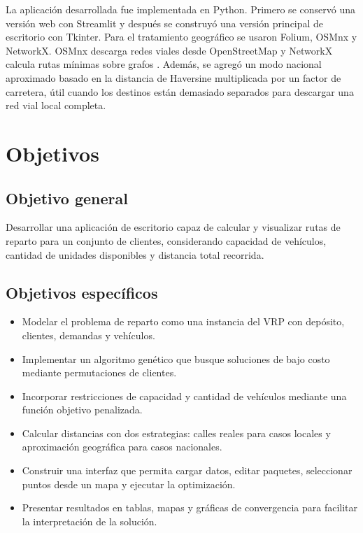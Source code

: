 \documentclass[runningheads]{llncs}
\begin{document}
La aplicación desarrollada fue implementada en Python. Primero se conservó una versión web con Streamlit y después se construyó una versión principal de escritorio con Tkinter. Para el tratamiento geográfico se usaron Folium, OSMnx y NetworkX. OSMnx descarga redes viales desde OpenStreetMap \cite{openstreetmap2017,boeing2017osmnx} y NetworkX calcula rutas mínimas sobre grafos \cite{networkx2008}. Además, se agregó un modo nacional aproximado basado en la distancia de Haversine multiplicada por un factor de carretera, útil cuando los destinos están demasiado separados para descargar una red vial local completa.

\section{Objetivos}

\subsection{Objetivo general}

Desarrollar una aplicación de escritorio capaz de calcular y visualizar rutas de reparto para un conjunto de clientes, considerando capacidad de vehículos, cantidad de unidades disponibles y distancia total recorrida.

\subsection{Objetivos específicos}

\begin{itemize}
    \item Modelar el problema de reparto como una instancia del VRP con depósito, clientes, demandas y vehículos.
    \item Implementar un algoritmo genético que busque soluciones de bajo costo mediante permutaciones de clientes.
    \item Incorporar restricciones de capacidad y cantidad de vehículos mediante una función objetivo penalizada.
    \item Calcular distancias con dos estrategias: calles reales para casos locales y aproximación geográfica para casos nacionales.
    \item Construir una interfaz que permita cargar datos, editar paquetes, seleccionar puntos desde un mapa y ejecutar la optimización.
    \item Presentar resultados en tablas, mapas y gráficas de convergencia para facilitar la interpretación de la solución.
\end{itemize}
\end{document}
